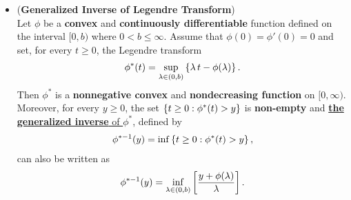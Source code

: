 \documentclass[11pt]{article}
\begin{document}
\begin{itemize}
\item \begin{lemma} (\textbf{Generalized Inverse of Legendre Transform}) \citep{boucheron2013concentration}\\
Let $\phi$ be a \textbf{convex} and \textbf{continuously differentiable} function defined on the interval $[0, b)$ where $0 < b \le \infty$. Assume that $\phi(0) = \phi'(0) = 0$ and set, for every $t \ge 0$, the Legendre transform 
\begin{align*}
\phi^{*}(t) = \sup_{\lambda \in (0, b)}\left\{\lambda\,t - \phi(\lambda)\right\}.
\end{align*}
Then $\phi^{*}$ is a \textbf{nonnegative convex} and \textbf{nondecreasing function} on $[0, \infty)$. Moreover, for every $y \ge 0$, the set $\left\{t \ge 0: \phi^{*}(t) > y\right\}$ is \textbf{non-empty} and \underline{\textbf{the generalized inverse} of $\phi^{*}$}, defined by
\begin{align}
\phi^{*-1}(y) = \inf\left\{t \ge 0 : \phi^{*}(t) > y\right\}, \label{eqn: generalized_inverse_legendre_transform}
\end{align} can also be written as
\begin{align*}
\phi^{*-1}(y) = \inf_{\lambda \in (0, b)}\left[\frac{y + \phi(\lambda)}{\lambda}\right].
\end{align*}
\end{lemma}


\end{itemize}
\end{document}
